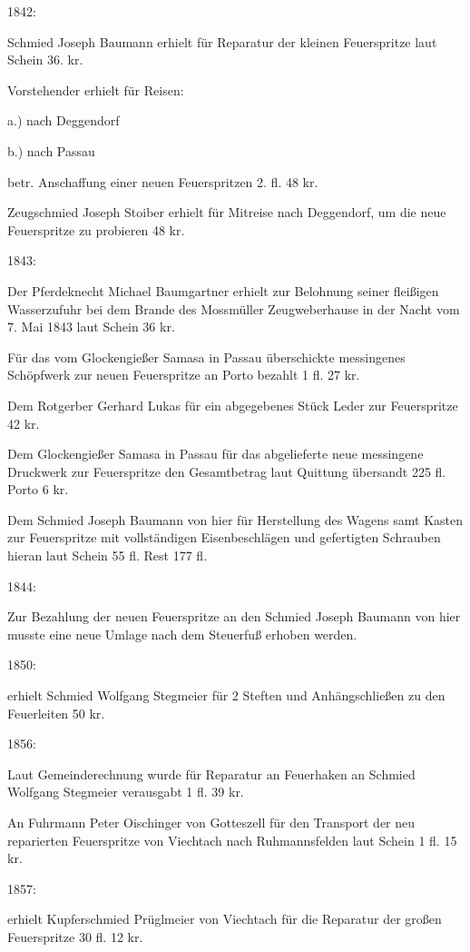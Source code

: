 1842:

Schmied Joseph Baumann erhielt für Reparatur der kleinen Feuerspritze laut
Schein 36. kr.

Vorstehender erhielt für Reisen:

a.) nach Deggendorf

b.) nach Passau

betr. Anschaffung einer neuen Feuerspritzen 2. fl. 48 kr.

Zeugschmied Joseph Stoiber erhielt für Mitreise nach Deggendorf, um die neue
Feuerspritze zu probieren 48 kr.

1843:

Der Pferdeknecht Michael Baumgartner erhielt zur Belohnung seiner fleißigen
Wasserzufuhr bei dem Brande des Mossmüller Zeugweberhause in der Nacht vom 7.
Mai 1843 laut Schein 36 kr.

Für das vom Glockengießer Samasa in Passau überschickte messingenes Schöpfwerk
zur neuen Feuerspritze an Porto bezahlt 1 fl. 27 kr.

Dem Rotgerber Gerhard Lukas für ein abgegebenes Stück Leder zur Feuerspritze 42
kr.

Dem Glockengießer Samasa in Passau für das abgelieferte neue messingene
Druckwerk zur Feuerspritze den Gesamtbetrag laut Quittung übersandt 225 fl.
Porto 6 kr.

Dem Schmied Joseph Baumann von hier für Herstellung des Wagens samt Kasten zur
Feuerspritze mit vollständigen Eisenbeschlägen und gefertigten Schrauben hieran
laut Schein 55 fl. Rest 177 fl.

1844:

Zur Bezahlung der neuen Feuerspritze an den Schmied Joseph Baumann von hier
musste eine neue Umlage nach dem Steuerfuß erhoben werden.

1850:

erhielt Schmied Wolfgang Stegmeier für 2 Steften und Anhängschließen zu den
Feuerleiten 50 kr.

1856:

Laut Gemeinderechnung wurde für Reparatur an Feuerhaken an Schmied Wolfgang
Stegmeier verausgabt 1 fl. 39 kr.

An Fuhrmann Peter Oischinger von Gotteszell für den Transport der neu
reparierten Feuerspritze von Viechtach nach Ruhmannsfelden laut Schein 1 fl. 15
kr.

1857:

erhielt Kupferschmied Prüglmeier von Viechtach für die Reparatur der großen
Feuerspritze 30 fl. 12 kr.

